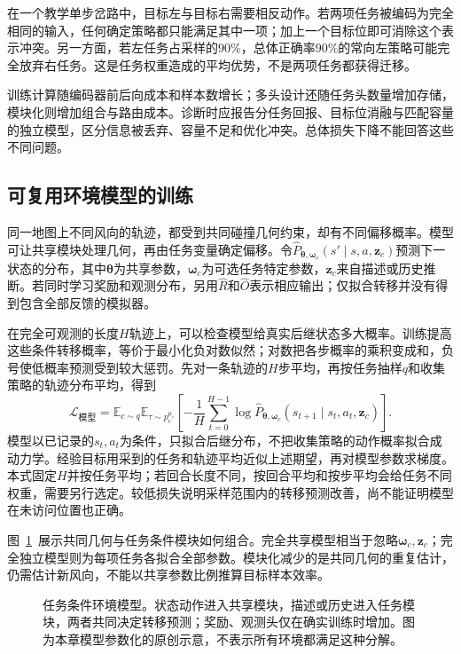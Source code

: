 在一个教学单步岔路中，目标左与目标右需要相反动作。若两项任务被编码为完全相同的输入，任何确定策略都只能满足其中一项；加上一个目标位即可消除这个表示冲突。另一方面，若左任务占采样的$90\%$，总体正确率$90\%$的常向左策略可能完全放弃右任务。这是任务权重造成的平均优势，不是两项任务都获得迁移。

训练计算随编码器前后向成本和样本数增长；多头设计还随任务头数量增加存储，模块化则增加组合与路由成本。诊断时应报告分任务回报、目标位消融与匹配容量的独立模型，区分信息被丢弃、容量不足和优化冲突。总体损失下降不能回答这些不同问题。

\subsection{可复用环境模型的训练}
\label{sec:rl-transfer-model-training}

同一地图上不同风向的轨迹，都受到共同碰撞几何约束，却有不同偏移概率。模型可让共享模块处理几何，再由任务变量确定偏移。令$\widehat P_{\bm\theta,\bm\omega_c}(s'\mid s,a,\bm z_c)$预测下一状态的分布，其中$\bm\theta$为共享参数，$\bm\omega_c$为可选任务特定参数，$\bm z_c$来自描述或历史推断。若同时学习奖励和观测分布，另用$\widehat R$和$\widehat O$表示相应输出；仅拟合转移并没有得到包含全部反馈的模拟器。

在完全可观测的长度$H$轨迹上，可以检查模型给真实后继状态多大概率。训练提高这些条件转移概率，等价于最小化负对数似然；对数把各步概率的乘积变成和，负号使低概率预测受到较大惩罚。先对一条轨迹的$H$步平均，再按任务抽样$q$和收集策略的轨迹分布平均，得到
\begin{equation}
 \mathcal L_{\text{模型}}
 =\mathbb E_{c\sim q}\mathbb E_{\tau\sim p_c^{\mu_c}}
 \left[-\frac1H\sum_{t=0}^{H-1}
 \log\widehat P_{\bm\theta,\bm\omega_c}
 (s_{t+1}\mid s_t,a_t,\bm z_c)\right].
 \label{eq:rl-transfer-model-loss}
\end{equation}
模型以已记录的$s_t,a_t$为条件，只拟合后继分布，不把收集策略的动作概率拟合成动力学。经验目标用采到的任务和轨迹平均近似上述期望，再对模型参数求梯度。本式固定$H$并按任务平均；若回合长度不同，按回合平均和按步平均会给任务不同权重，需要另行选定。较低损失说明采样范围内的转移预测改善，尚不能证明模型在未访问位置也正确。

图~\ref{fig:rl-transfer-model}~展示共同几何与任务条件模块如何组合。完全共享模型相当于忽略$\bm\omega_c,\bm z_c$；完全独立模型则为每项任务各拟合全部参数。模块化减少的是共同几何的重复估计，仍需估计新风向，不能以共享参数比例推算目标样本效率。

\begin{figure}[htbp]
  \centering
  
  \caption{任务条件环境模型。状态动作进入共享模块，描述或历史进入任务模块，两者共同决定转移预测；奖励、观测头仅在确实训练时增加。图为本章模型参数化的原创示意，不表示所有环境都满足这种分解。}
  \label{fig:rl-transfer-model}
\end{figure}

